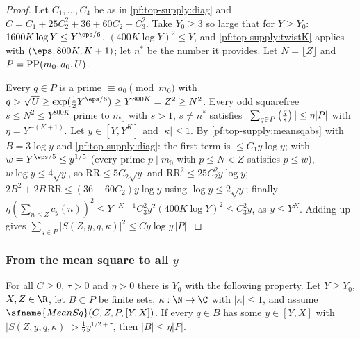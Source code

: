 \begin{proof}
Let $C_1,\dots,C_4$ be as in \cref{pf:top-supply:diag} and $C=C_1+25C_2^2+36+60C_2+C_3^2$. Take $Y_0\ge3$ so large
that for $Y\ge Y_0$: $1600K\log Y\le Y^{\eps/6}$, $(400K\log Y)^2\le Y$, and \cref{pf:top-supply:twistK} applies with
$(\eps,800K,K+1)$; let $n^*$ be the number it provides. Let $N=\lfloor Z\rfloor$ and $P=\operatorname{PP}(m_0,a_0,U)$.

Every $q\in P$ is a prime $\equiv a_0\pmod{m_0}$ with $q>\sqrt U\ge\exp(\frac12Y^{\eps/6})\ge Y^{800K}=Z^2\ge N^2$. Every odd
squarefree $s\le N^2\le Y^{800K}$ prime to $m_0$ with $s>1$, $s\ne n^*$ satisfies
$|\sum_{q\in P}\left(\frac{q}{s}\right)|\le\eta|P|$ with $\eta=Y^{-(K+1)}$. Let $y\in[Y,Y^K]$ and $|\kappa|\le1$. By
\cref{pf:top-supply:meansqabs} with $B=3\log y$ and \cref{pf:top-supply:diag}: the first term is $\le C_1y\log y$; with
$w=Y^{\eps/5}\le y^{1/5}$ (every prime $p\mid m_0$ with $p\le N<Z$ satisfies $p\le w$), $w\log y\le4\sqrt y$, so
$\mathrm{RR}\le5C_2\sqrt y$ and $\mathrm{RR}^2\le25C_2^2y\log y$; $2B^2+2B\,\mathrm{RR}\le(36+60C_2)y\log y$ using
$\log y\le2\sqrt y$; finally $\eta(\sum_{n\le Z}c_y(n))^2\le Y^{-K-1}C_3^2y^2(400K\log Y)^2\le C_3^2y$, as
$y\le Y^K$. Adding up gives $\sum_{q\in P}|S(Z,y,q,\kappa)|^2\le Cy\log y\,|P|$.
\end{proof}

\subsubsection{From the mean square to all $y$}

\begin{proposition}\label{pf:top-supply:badshare}
For all $C\ge0$, $\tau>0$ and $\eta>0$ there is $Y_0$ with the following property. Let $Y\ge Y_0$, $X,Z\in\R$, let
$B\subset P$ be finite sets, $\kappa:\N\to\C$ with $|\kappa|\le1$, and assume $\sfname{MeanSq}(C,Z,P,[Y,X])$. If every
$q\in B$ has some $y\in[Y,X]$ with $|S(Z,y,q,\kappa)|>\frac12y^{1/2+\tau}$, then $|B|\le\eta|P|$.
  
\end{proposition}

